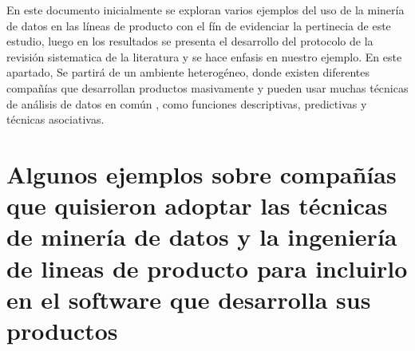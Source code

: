En este documento inicialmente se exploran varios ejemplos del uso de la minería de datos en las líneas de producto con el fín de evidenciar la pertinecia de este estudio, luego en los resultados se presenta el desarrollo del protocolo de la revisión sistematica de la literatura y se hace enfasis en nuestro ejemplo. En este apartado, Se partirá de un ambiente heterogéneo, donde existen diferentes compañías que desarrollan productos masivamente y pueden usar  muchas técnicas de análisis de datos en común \cite{Thum2014}, como funciones descriptivas, predictivas y técnicas  asociativas. 

\section*{Algunos ejemplos sobre  compañías que quisieron adoptar las técnicas de minería de datos y la ingeniería de lineas de producto para incluirlo en el software que desarrolla sus productos} 

